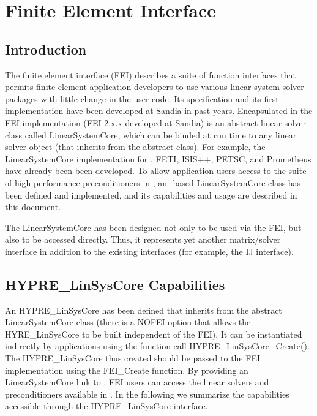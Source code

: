 \chapter{Finite Element Interface}
\label{chapter-FEI}

\section{Introduction}

The finite element interface (FEI) describes a suite of function interfaces 
that permits finite element application developers to use various linear 
system solver packages with little change in the user code.  Its 
specification and its first implementation have been developed at Sandia 
in past years.  Encapsulated in the FEI implementation (FEI 2.x.x developed at 
Sandia) is an abstract linear solver class called {\sf LinearSystemCore}, which 
can be binded at run time to any linear solver object (that inherits from the 
abstract class).  For example, the {\sf LinearSystemCore} implementation for 
\hypre{}, FETI, ISIS++, PETSC, and Prometheus have already been been 
developed.  To allow application users access to the suite of high performance 
preconditioners in \hypre{}, an \hypre{}-based 
{\sf LinearSystemCore} class has been defined and 
implemented, and its capabilities and usage are described in this document.

The \hypre{} {\sf LinearSystemCore} has been designed not only to be used via 
the FEI, but also to be accessed directly.  Thus, it represents yet another 
matrix/solver interface in addition to the existing interfaces (for example, 
the IJ interface).

\section{HYPRE\_LinSysCore Capabilities}

An {\sf HYPRE\_LinSysCore} has been defined that inherits from the abstract 
{\sf LinearSystemCore} class (there is a {\sf NOFEI} option that allows the
{\sf HYRE\_LinSysCore} to be built independent of the {\sf FEI}).  It can be 
instantiated indirectly by applications using the function call 
{\sf HYPRE\_LinSysCore\_Create()}.  The {\sf HYPRE\_LinSysCore} thus created 
should be passed to the {\sf FEI} implementation using the {\sf FEI\_Create} 
function.  By providing an {\sf LinearSystemCore} link to \hypre{}, FEI 
users can access the linear solvers and preconditioners available in 
\hypre{}.  In the following we summarize the \hypre{} capabilities 
accessible through the {\sf HYPRE\_LinSysCore} interface.

